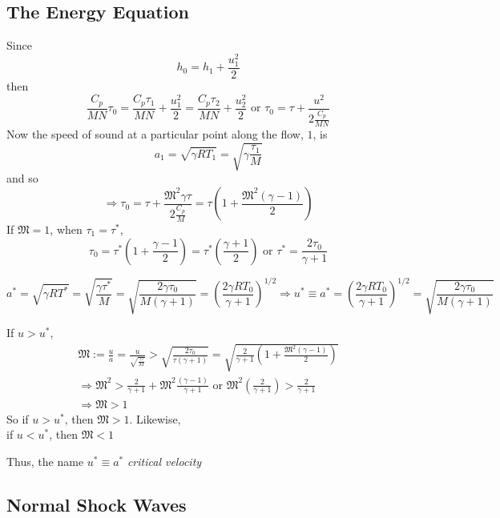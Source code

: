 \documentclass[twoside,landscape,10pt]{amsart}
\theoremstyle{plain}
\theoremstyle{definition}
\theoremstyle{remark}
\theoremstyle{remark}
\begin{document}
\begin{multicols*}{2}
\subsection{The Energy Equation}

Since 
\[
h_0 = h_1 + \frac{u_1^2}{2}
\]
then
\[
\frac{C_p}{MN} \tau_0 = \frac{C_p \tau_1}{MN} + \frac{u_1^2}{2} = \frac{C_p \tau_2}{MN} + \frac{u_2^2}{2} \text{ or } \tau_0 = \tau + \frac{u^2}{ 2 \frac{C_p}{MN} }
\]
Now the speed of sound at a particular point along the flow, $1$, is 
\[
a_1 = \sqrt{ \gamma RT_1 } = \sqrt{ \gamma \frac{\tau_1}{M} }
\]
and so 
\[
\Longrightarrow \tau_0 = \tau + \frac{ \mathfrak{M}^2 \gamma \tau }{ 2 \frac{C_p}{M}} = \tau \left( 1 + \frac{ \mathfrak{M}^2 (\gamma-1) }{2} \right)
\]
If $\mathfrak{M}=1$, when $\tau_1=\tau^*$, 
\[
\tau_0 = \tau^* \left( 1 + \frac{\gamma -1}{2} \right) = \tau^* \left( \frac{\gamma + 1 }{2} \right)
\text{ or } \tau^* = \frac{ 2\tau_0 }{ \gamma + 1 } 
\]

\begin{equation}\label{Eq:criticalvelocity}
a^* = \sqrt{ \gamma R T^*} = \sqrt{ \frac{\gamma \tau^* }{M} } = \sqrt{ \frac{2\gamma \tau_0 }{ M(\gamma + 1 ) } } = \left( \frac{2\gamma R T_0 }{\gamma + 1 } \right)^{1/2} \Longrightarrow u^* \equiv a^*  = \left( \frac{2\gamma RT_0 }{ \gamma + 1 } \right)^{1/2} = \sqrt{ \frac{2\gamma \tau_0}{M(\gamma +1) } }
\end{equation}

If $u > u^*$, 
\[
\begin{gathered}
  \mathfrak{M} := \frac{u}{a} = \frac{u}{ \sqrt{ \frac{ \gamma \tau }{ M } } } > \sqrt{ \frac{ 2\tau_0}{ \tau (\gamma + 1 ) } } = \sqrt{ \frac{2}{\gamma +1 } (1 + \frac{ \mathfrak{M}^2(\gamma - 1) }{2}  ) } \\ 
  \Longrightarrow \mathfrak{M}^2 > \frac{2}{\gamma +1 } + \mathfrak{M}^2 \frac{ (\gamma - 1) }{ \gamma + 1 } \text{ or } \mathfrak{M}^2 \left( \frac{2}{\gamma + 1} \right) > \frac{2}{\gamma +1 } \\
  \Longrightarrow \mathfrak{M} > 1
\end{gathered}
\]
So if $u > u^*$, then $\mathfrak{M}>1$.  Likewise, \\
\phantom{So } if $u < u^*$, then $\mathfrak{M}<1$

Thus, the name $u^*\equiv a^*$ \emph{critical velocity}

\subsection{Normal Shock Waves}


\end{multicols*}
\end{document}
